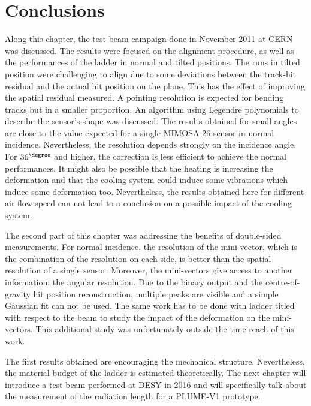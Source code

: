   \section{Conclusions}

  Along this chapter, the test beam campaign done in November 2011 at \gls{CERN} was discussed. 
  The results were focused on the alignment procedure, as well as the performances of the ladder in normal and tilted positions.
  The runs in tilted position were challenging to align due to some deviations between the track-hit residual and the actual hit position on the plane.
  This has the effect of improving the spatial residual measured.
  A pointing resolution is expected for bending tracks but in a smaller proportion.
  An algorithm using Legendre polynomials to describe the sensor's shape was discussed.
  The results obtained for small angles are close to the value expected for a single \gls{MIMOSA}-26 sensor in normal incidence. 
  Nevertheless, the resolution depends strongly on the incidence angle.
  For $36^{\degree}$ and higher, the correction is less efficient to achieve the normal performances.
  It might also be possible that the heating is increasing the deformation and that the cooling system could induce some vibrations which induce some deformation too.
  Nevertheless, the results obtained here for different air flow speed can not lead to a conclusion on a possible impact of the cooling system.

  The second part of this chapter was addressing the benefits of double-sided measurements.
  For normal incidence, the resolution of the mini-vector, which is the combination of the resolution on each side,  is better than the spatial resolution of a single sensor.
  Moreover, the mini-vectors give access to another information: the angular resolution.
  Due to the binary output and the centre-of-gravity hit position reconstruction, multiple peaks are visible and a simple Gaussian fit can not be used. 
  The same work has to be done with ladder titled with respect to the beam to study the impact of the deformation on the mini-vectors.
  This additional study was unfortunately outside the time reach of this work.

  The first results obtained are encouraging the mechanical structure.
  Nevertheless, the material budget of the ladder is estimated theoretically.
  The next chapter will introduce a test beam performed at \gls{DESY} in 2016 and will specifically talk about the measurement of the radiation length for a \gls{PLUME}-V1 prototype.

